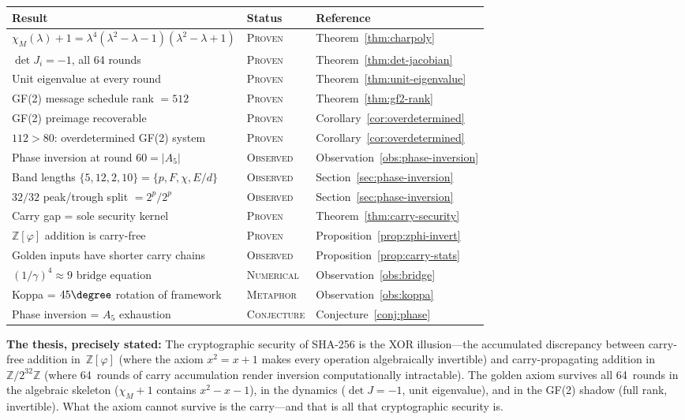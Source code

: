 \documentclass[12pt, a4paper]{article}
\theoremstyle{plain}
\theoremstyle{definition}
\newcommand{\Z}{\mathbb{Z}}
\newcommand{\vp}{\varphi}
\newcommand{\Zphi}{\Z[\vp]}
\newcommand{\charpoly}{\chi_M}
\begin{document}
\begin{center}
\begin{longtable}{p{5cm}p{2.5cm}p{5.5cm}}
\toprule
\textbf{Result} & \textbf{Status} & \textbf{Reference}\\
\midrule
\endhead
$\charpoly(\lambda)+1=\lambda^{4}(\lambda^{2}-\lambda-1)(\lambda^{2}-\lambda+1)$
& \textsc{Proven} & Theorem~\ref{thm:charpoly}\\[3pt]
$\det J_{i}=-1$, all 64 rounds
& \textsc{Proven} & Theorem~\ref{thm:det-jacobian}\\[3pt]
Unit eigenvalue at every round
& \textsc{Proven} & Theorem~\ref{thm:unit-eigenvalue}\\[3pt]
GF(2) message schedule rank $=512$
& \textsc{Proven} & Theorem~\ref{thm:gf2-rank}\\[3pt]
GF(2) preimage recoverable
& \textsc{Proven} & Corollary~\ref{cor:overdetermined}\\[3pt]
$112>80$: overdetermined GF(2) system
& \textsc{Proven} & Corollary~\ref{cor:overdetermined}\\[3pt]
Phase inversion at round $60=|A_{5}|$
& \textsc{Observed} & Observation~\ref{obs:phase-inversion}\\[3pt]
Band lengths $\{5,12,2,10\}=\{p,F,\chi,E/d\}$
& \textsc{Observed} & Section~\ref{sec:phase-inversion}\\[3pt]
$32/32$ peak/trough split $=2^{p}/2^{p}$
& \textsc{Observed} & Section~\ref{sec:phase-inversion}\\[3pt]
Carry gap = sole security kernel
& \textsc{Proven} & Theorem~\ref{thm:carry-security}\\[3pt]
$\Zphi$ addition is carry-free
& \textsc{Proven} & Proposition~\ref{prop:zphi-invert}\\[3pt]
Golden inputs have shorter carry chains
& \textsc{Observed} & Proposition~\ref{prop:carry-stats}\\[3pt]
$(1/\gamma)^{4}\approx 9$ bridge equation
& \textsc{Numerical} & Observation~\ref{obs:bridge}\\[3pt]
Koppa = $45\degree$ rotation of framework
& \textsc{Metaphor} & Observation~\ref{obs:koppa}\\[3pt]
Phase inversion = $A_{5}$ exhaustion
& \textsc{Conjecture} & Conjecture~\ref{conj:phase}\\
\bottomrule
\end{longtable}
\end{center}

\noindent\textbf{The thesis, precisely stated:}
The cryptographic security of SHA-256 is the XOR
illusion---the accumulated discrepancy between carry-free
addition in~$\Zphi$ (where the axiom $x^{2}=x+1$ makes every
operation algebraically invertible) and carry-propagating
addition in $\Z/2^{32}\Z$ (where 64~rounds of carry accumulation
render inversion computationally intractable).
The golden axiom survives all 64~rounds in the algebraic
skeleton ($\charpoly+1$ contains $x^{2}-x-1$), in the dynamics
($\det J=-1$, unit eigenvalue), and in the GF(2) shadow
(full rank, invertible).
What the axiom cannot survive is the carry---and that is all
that cryptographic security is.
\end{document}

